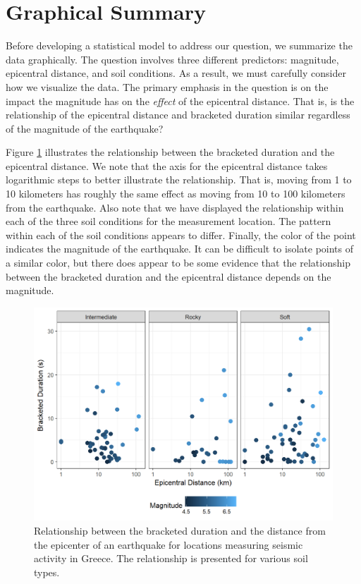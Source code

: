 \documentclass[]{book}
\theoremstyle{plain}
\theoremstyle{mydefn}
\theoremstyle{myexmpl}
\theoremstyle{remark}
\begin{document}
\section{Graphical Summary}\label{graphical-summary}

Before developing a statistical model to address our question, we
summarize the data graphically. The question involves three different
predictors: magnitude, epicentral distance, and soil conditions. As a
result, we must carefully consider how we visualize the data. The
primary emphasis in the question is on the impact the magnitude has on
the \emph{effect} of the epicentral distance. That is, is the
relationship of the epicentral distance and bracketed duration similar
regardless of the magnitude of the earthquake?

Figure \ref{fig:regrecap-plot} illustrates the relationship between the
bracketed duration and the epicentral distance. We note that the axis
for the epicentral distance takes logarithmic steps to better illustrate
the relationship. That is, moving from 1 to 10 kilometers has roughly
the same effect as moving from 10 to 100 kilometers from the earthquake.
Also note that we have displayed the relationship within each of the
three soil conditions for the measurement location. The pattern within
each of the soil conditions appears to differ. Finally, the color of the
point indicates the magnitude of the earthquake. It can be difficult to
isolate points of a similar color, but there does appear to be some
evidence that the relationship between the bracketed duration and the
epicentral distance depends on the magnitude.

\begin{figure}

{\centering \includegraphics[width=0.8\linewidth]{./Images/regrecap-plot-1} 

}

\caption{Relationship between the bracketed duration and the distance from the epicenter of an earthquake for locations measuring seismic activity in Greece.  The relationship is presented for various soil types.}\label{fig:regrecap-plot}
\end{figure}
\end{document}
